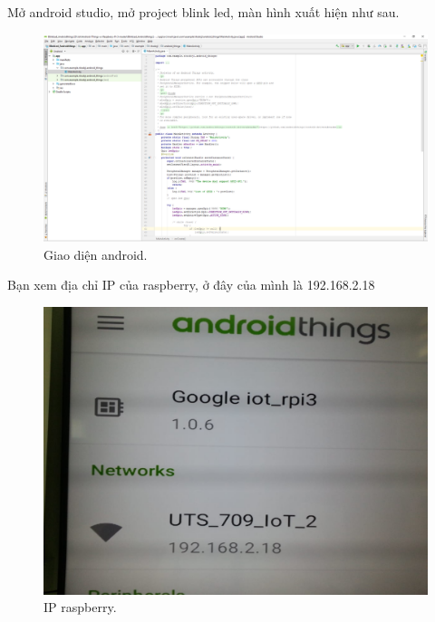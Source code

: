 Mở android studio, mở project blink led, màn hình xuất hiện như sau.
 \begin{center}
    \begin{figure}[htp]
    \begin{center}
     \includegraphics[scale=0.3]{image3/androidblinkled}
    \end{center}
    \caption{Giao diện android.}
    \label{refhinh1}
    \end{figure}
\end{center}

Bạn xem địa chỉ IP của raspberry, ở đây của mình là 192.168.2.18
\begin{center}
    \begin{figure}[htp]
    \begin{center}
     \includegraphics[scale=0.15]{image3/ip.jpg}
    \end{center}
    \caption{IP raspberry.}
    \label{refhinh1}
    \end{figure}
\end{center}
 
